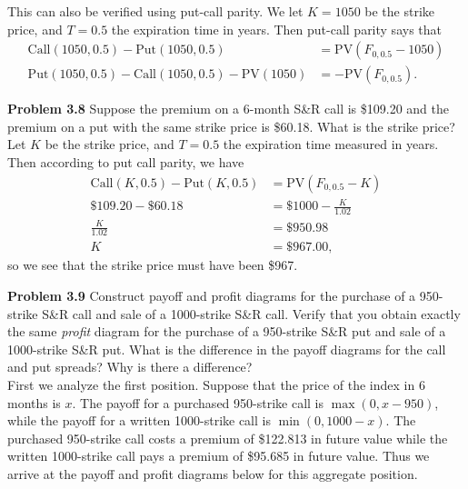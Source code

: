 \documentclass[12pt]{article}
\newcommand{\problem}[1]{\bigskip \noindent \textbf{Problem #1}}
\newcommand{\Call}{\text{Call}}
\newcommand{\Put}{\text{Put}}
\newcommand{\PV}{\text{PV}}
\theoremstyle{plain}
\begin{document}
This can also be verified using put-call parity. We let $K = 1050$ be the strike price, and $T = 0.5$ the expiration time in years. Then put-call parity says that
\begin{align*}
\Call(1050,0.5) - \Put(1050,0.5) &= \PV(F_{0,0.5} - 1050)\\
\Put(1050,0.5) - \Call(1050,0.5) - \PV(1050) &= -\PV(F_{0,0.5}).
\end{align*}

\problem{3.8} Suppose the premium on a 6-month S\&R call is \$109.20 and the premium on a put with the same strike price is \$60.18. What is the strike price?\\

Let $K$ be the strike price, and $T = 0.5$ the expiration time measured in years. Then according to put call parity, we have
\begin{align*}
\Call(K,0.5) - \Put(K,0.5) &= \PV(F_{0,0.5} - K)\\
\$109.20 - \$60.18 &= \$1000 - \frac{K}{1.02}\\
\frac{K}{1.02} &= \$950.98\\
K &= \$967.00,
\end{align*}
so we see that the strike price must have been \$967.

\problem{3.9} Construct payoff and profit diagrams for the purchase of a 950-strike S\&R call and sale of a 1000-strike S\&R call. Verify that you obtain exactly the same \emph{profit} diagram for the purchase of a 950-strike S\&R put and sale of a 1000-strike S\&R put. What is the difference in the payoff diagrams for the call and put spreads? Why is there a difference?\\

First we analyze the first position. Suppose that the price of the index in 6 months is $x$. The payoff for a purchased 950-strike call is $\max(0,x-950)$, while the payoff for a written 1000-strike call is $\min(0,1000-x)$. The purchased 950-strike call costs a premium of \$122.813 in future value while the written 1000-strike call pays a premium of \$95.685 in future value. Thus we arrive at the payoff and profit diagrams below for this aggregate position.

\begin{center}
\end{center}
\end{document}
